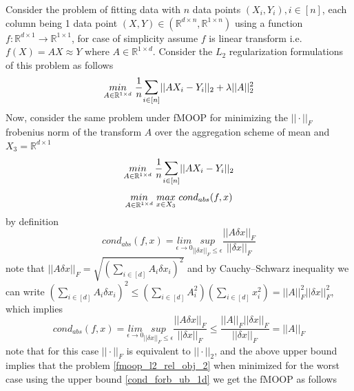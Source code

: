 Consider the problem of fitting data with $n$ data points $(X_i,Y_i), i \in [n]$, each column being 1 data point $(X,Y) \in (\mathbb{R}^{d\times n},\mathbb{R}^{1\times n})$ using a function $f:\mathbb{R}^{d\times 1}\to \mathbb{R}^{1\times 1}$, for case of simplicity assume $f$ is linear transform i.e. $f(X) = AX \approx Y$ where $A \in \mathbb{R}^{1\times d}$.
\newline Consider the $L_2$ regularization formulations of this problem as follows
\begin{equation} \label{l2_reg_prob_obj}
    \underset{A \in \mathbb{R}^{1\times d}}{min}\hspace{1mm} \frac{1}{n}\mathlarger{\sum}_{i\in [n]} ||AX_i-Y_i||_2 + \lambda ||A||^{2}_{2}
\end{equation}
Now, consider the same problem under fMOOP for minimizing the $||\cdot||_{F}$ frobenius norm of the transform $A$ over the aggregation scheme of mean and $X_3 = \mathbb{R}^{d\times 1}$
\begin{equation} \label{fmoop_l2_rel_obj_1}
    \underset{A \in \mathbb{R}^{1\times d}}{min}\hspace{1mm} \frac{1}{n}\mathlarger{\sum}_{i\in [n]} ||AX_i-Y_i||_2
\end{equation}
\begin{equation} \label{fmoop_l2_rel_obj_2}
    \underset{A \in \mathbb{R}^{1\times d}}{min}\hspace{1mm} \underset{x \in X_3}{max}\hspace{1mm} cond_{abs}(f,x)
\end{equation}
by definition 
\begin{equation}
    cond_{abs}(f,x) = \underset{\epsilon \to 0}{lim}\underset{||\delta x||_F\le \epsilon}{sup} \frac{||A\delta x||_F}{||\delta x||_F}
\end{equation}
note that $||A\delta x||_F = \sqrt{(\sum_{i\in [d]} A_i\delta x_i)^2}$ and by Cauchy–Schwarz inequality we can write $(\sum_{i\in [d]} A_i\delta x_i)^2 \le (\sum_{i\in [d]} A^2_i)(\sum_{i\in [d]} x^2_i) =||A||^2_F||\delta x||^2_F $, which implies 
\begin{equation} \label{cond_forb_ub_1d}
    cond_{abs}(f,x) = \underset{\epsilon \to 0}{lim}\underset{||\delta x||_F\le \epsilon}{sup} \frac{||A\delta x||_F}{||\delta x||_F} \le \frac{||A||_F||\delta x||_F}{||\delta x||_F} = ||A||_F
\end{equation}
note that for this case $||\cdot||_F$ is equivalent to $||\cdot||_2$, and the above upper bound implies that the problem \ref{fmoop_l2_rel_obj_2} when minimized for the worst case using the upper bound \ref{cond_forb_ub_1d} we get the fMOOP as follows
